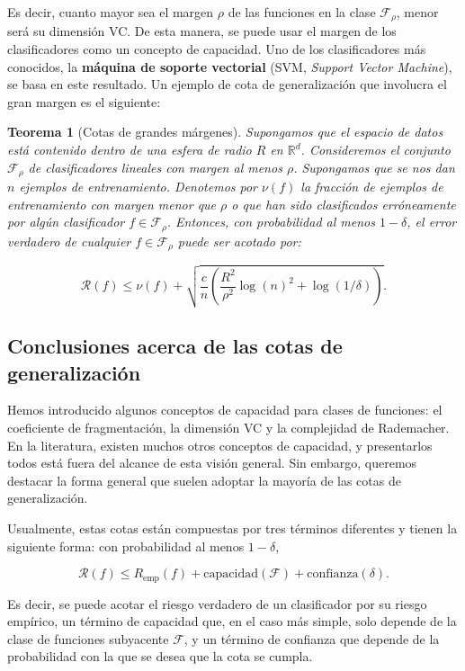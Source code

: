 \documentclass{report}
\newtheorem{thm}{Teorema}[section]
\begin{document}
Es decir, cuanto mayor sea el margen \(\rho\) de las funciones
en la clase \(\mathcal{F}_\rho\), menor será su dimensión VC. De esta manera, se puede usar el
margen de los clasificadores como un concepto de capacidad. Uno de los clasificadores más conocidos,
la \textbf{máquina de soporte vectorial} (SVM, \textit{Support Vector Machine}), se basa en este
resultado. Un ejemplo de cota de generalización que involucra el gran margen es el siguiente:

\begin{thm}[Cotas de grandes márgenes]

Supongamos que el espacio de datos está contenido dentro de una esfera de radio \(R\) en
\(\mathbb{R}^d\). Consideremos el conjunto \(\mathcal{F}_\rho\) de clasificadores lineales con
margen al menos \(\rho\). Supongamos que se nos dan \(n\) ejemplos de entrenamiento. Denotemos
por \(\nu(f)\) la fracción de ejemplos de entrenamiento con margen menor que \(\rho\) o que han
sido clasificados erróneamente por algún clasificador \(f \in \mathcal{F}_\rho\). Entonces, con
probabilidad al menos \(1 - \delta\), el error verdadero de cualquier \(f \in \mathcal{F}_\rho\)
puede ser acotado por:

\[
\mathcal{R}(f) \leq \nu(f) + \sqrt{\frac{c}{n} \left( \frac{R^2}{\rho^2} \log(n)^2 + \log(1/\delta) \right)} .
\]
\end{thm}

\subsection{Conclusiones acerca de las cotas de generalización}

Hemos introducido algunos conceptos de capacidad para clases de funciones: el
coeficiente de fragmentación, la dimensión VC y la complejidad de Rademacher. En la literatura,
existen muchos otros conceptos de capacidad, y presentarlos todos está fuera del alcance de esta
visión general. Sin embargo, queremos destacar la forma general que suelen adoptar la mayoría
de las cotas de generalización.

Usualmente, estas cotas están compuestas por tres términos diferentes y tienen la siguiente forma:
con probabilidad al menos \(1 - \delta\),

\[
\mathcal{R}(f) \leq R_{\text{emp}}(f) + \text{capacidad}(\mathcal{F}) + \text{confianza}(\delta).
\]

Es decir, se puede acotar el riesgo verdadero de un clasificador por su riesgo empírico, un término
de capacidad que, en el caso más simple, solo depende de la clase de funciones subyacente
\(\mathcal{F}\), y un término de confianza que depende de la probabilidad con la que se desea que
la cota se cumpla.
\end{document}
